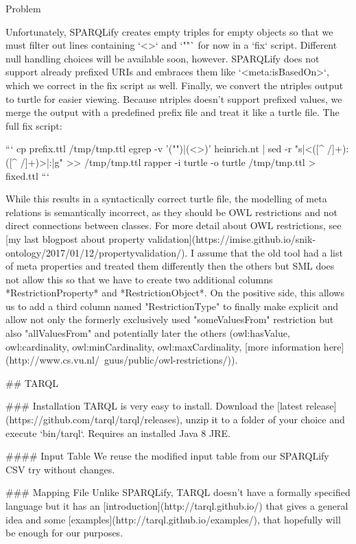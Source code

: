 \documentclass{beamer}
\begin{document}
\begin{frame}{Problem}
\begin{frame}{}
\begin{frame}{}
\begin{frame}{}
Unfortunately, SPARQLify creates empty triples for empty objects so that we must filter out lines containing `<>` and `""` for now in a `fix` script.
Different null handling choices will be available soon, however.
SPARQLify does not support already prefixed URIs and embraces them like `<meta:isBasedOn>`, which we correct in the fix script as well.
Finally, we convert the ntriples output to turtle for easier viewing.
Because ntriples doesn't support prefixed values, we merge the output with a predefined prefix file and treat it like a turtle file.
The full fix script:

```
cp prefix.ttl /tmp/tmp.ttl                                                                                                                                                                                                                    
egrep -v '("")|(<>)' heinrich.nt | sed -r "s|<([^ /]+):([^ /]+)>|\1:\2|g" >> /tmp/tmp.ttl
rapper -i turtle -o turtle /tmp/tmp.ttl > fixed.ttl
```

While this results in a syntactically correct turtle file, the modelling of meta relations is semantically incorrect, as they should be OWL restrictions and not direct connections between classes.
For more detail about OWL restrictions,  see [my last blogpost about property validation](https://imise.github.io/snik-ontology/2017/01/12/propertyvalidation/).
I assume that the old tool had a list of meta properties and treated them differently then the others but SML does not allow this so that we have to create two additional columns *RestrictionProperty* and *RestrictionObject*.
On the positive side, this allows us to add a third column named "RestrictionType" to finally make explicit and allow not only the formerly exclusively used "someValuesFrom" restriction but also "allValuesFrom" and potentially later the others (owl:hasValue, owl:cardinality, owl:minCardinality, owl:maxCardinality, [more information here](http://www.cs.vu.nl/~guus/public/owl-restrictions/)).

## TARQL

### Installation
TARQL is very easy to install. Download the [latest release](https://github.com/tarql/tarql/releases), unzip it to a folder of your choice and execute `bin/tarql`. Requires an installed Java 8 JRE.

#### Input Table
We reuse the modified input table from our SPARQLify CSV try without changes.

### Mapping File
Unlike SPARQLify, TARQL doesn't have a formally specified language but it has an [introduction](http://tarql.github.io/) that gives a general idea and some [examples](http://tarql.github.io/examples/), that hopefully will be enough for our purposes.


\end{frame}
\end{frame}
\end{frame}
\end{frame}
\end{document}

